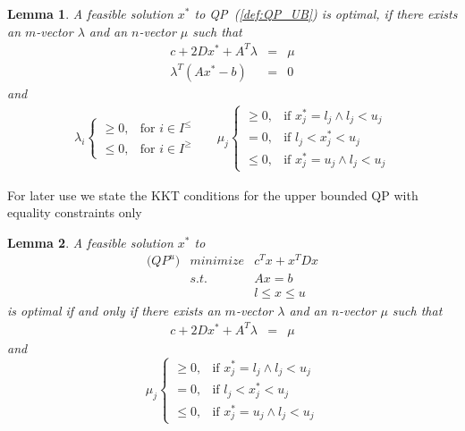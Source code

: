 \documentclass[a4paper]{article}
\newtheorem{lemma}{Lemma}
\begin{document}
\begin{lemma}
A feasible solution $x^{*}$ to QP~(\ref{def:QP_UB}) is optimal, if there exists an $m$-vector $\lambda$ and an $n$-vector $\mu$ such that 
\begin{eqnarray}
c + 2Dx^{*} +A^{T}\lambda
&=&
\mu  \\
\lambda^{T}\left(Ax^{*}-b\right)
&=&
0
\end{eqnarray}
and
\begin{eqnarray}
\label{def:mu_opt_cond}
\lambda_{i} \left\{
\begin{array}{ll}
\geq 0, & \text{for $i \in I^{\leq}$} \\
\leq 0, & \text{for $i \in I^{\geq}$}
\end{array}
\right.
&&
\mu_{j} \left\{
\begin{array}{ll}
\geq 0, & \mbox{if $x_{j}^{*}=l_{j} \wedge l_{j}<u_{j}$} \\
= 0,    & \mbox{if $l_{j} < x_{j}^{*} < u_{j}$} \\
\leq 0, & \mbox{if $x_{j}^{*}=u_{j} \wedge l_{j}<u_{j}$}
\end{array}
\right.
\end{eqnarray}
\end{lemma}
For later use we state the KKT conditions for the upper bounded QP with equality constraints only
\begin{lemma}
\label{lem:KKT_QP_UB_eq}
A feasible solution $x^{*}$ to
\begin{eqnarray}
  \mbox{($QP^{u}$)} &minimize& c^{T}x +x^{T}Dx
\nonumber      \\
\label{eq:QP_UB_eq_feas_cons}
    & s.t. & Ax = b  \\
\label{eq:QP_UB_eq_var_feas_cons}
    & & l \leq x \leq u  
\end{eqnarray}
is optimal if and only if there exists an $m$-vector $\lambda$ and an $n$-vector
$\mu$ such that
\begin{eqnarray}
c + 2Dx^{*} +A^{T}\lambda
&=&
\mu  
\end{eqnarray}
and
\begin{equation}
\label{eq:KKT_QP_UB_eq_mu_cond}
\mu_{j} \left\{
\begin{array}{ll}
\geq 0, & \text{if $x_{j}^{*}=l_{j} \wedge l_{j}<u_{j}$} \\
= 0,    & \text{if $l_{j} < x_{j}^{*} < u_{j}$} \\
\leq 0, & \text{if $x_{j}^{*}=u_{j} \wedge l_{j}<u_{j}$}
\end{array}
\right.
\end{equation} 
\end{lemma}
\end{document}
